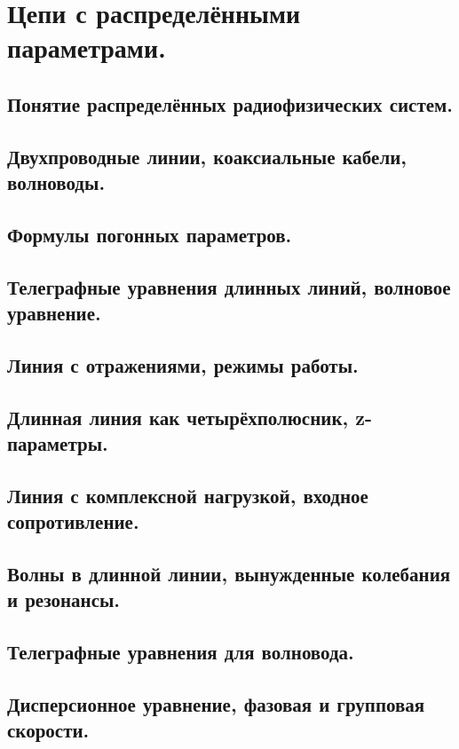 \documentclass[../main/main.tex]{subfiles}
\begin{document}
\section{Цепи с распределёнными параметрами.}

\subsection{Понятие распределённых радиофизических систем.}

\subsection{Двухпроводные линии, коаксиальные кабели, волноводы.}

\subsection{Формулы погонных параметров.}

\subsection{Телеграфные уравнения длинных линий, волновое уравнение.}

\subsection{Линия с отражениями, режимы работы.}

\subsection{Длинная линия как четырёхполюсник, z-параметры.}

\subsection{Линия с комплексной нагрузкой, входное сопротивление.}

\subsection{Волны в длинной линии, вынужденные колебания и резонансы.}

\subsection{Телеграфные уравнения для волновода.}

\subsection{Дисперсионное уравнение, фазовая и групповая скорости.}
\end{document}
